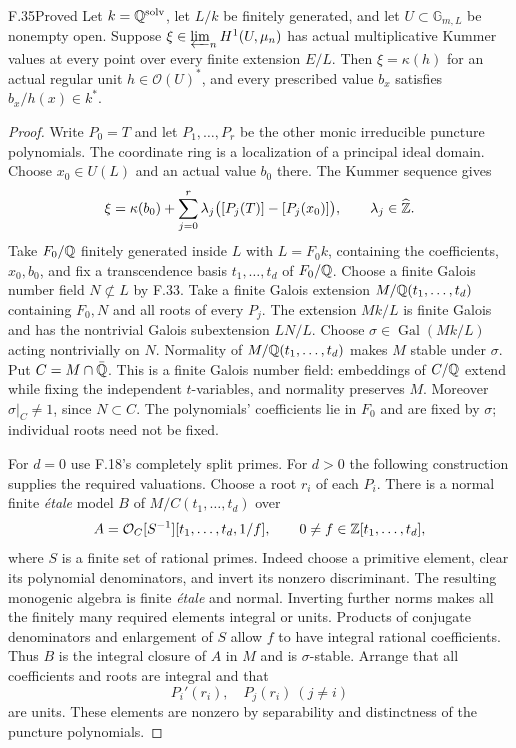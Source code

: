 \begin{claim}{F.35}{Proved}
Let $k=\mathbb Q^{\mathrm{solv}}$, let $L/k$ be finitely generated,
and let $U\subset\mathbb G_{m,L}$ be nonempty open. Suppose
$\xi\in\varprojlim_n H^1(U,\mu_n)$ has actual multiplicative
Kummer values at every point over every finite extension $E/L$.
Then $\xi=\kappa(h)$ for an actual regular unit
$h\in\mathcal O(U)^*$, and every prescribed value $b_x$ satisfies
$b_x/h(x)\in k^*$.
\end{claim}
\begin{proof}
Write $P_0=T$ and let $P_1,\ldots,P_r$ be the other monic
irreducible puncture polynomials. The coordinate ring is a
localization of a principal ideal domain. Choose $x_0\in U(L)$
and an actual value $b_0$ there. The Kummer sequence gives
\[
 \xi=\kappa(b_0)+\sum_{j=0}^r\lambda_j
       \bigl([P_j(T)]-[P_j(x_0)]\bigr),
       \qquad\lambda_j\in\widehat{\mathbb Z}.
\]
Take $F_0/\mathbb Q$ finitely generated inside $L$ with $L=F_0k$,
containing the coefficients, $x_0,b_0$, and fix a transcendence
basis $t_1,\ldots,t_d$ of $F_0/\mathbb Q$.
Choose a finite Galois number field $N\not\subset L$ by F.33.
Take a finite Galois extension $M/\mathbb Q(t_1,\ldots,t_d)$ containing
$F_0,N$ and all roots of every $P_j$. The extension $Mk/L$
is finite Galois and has the nontrivial Galois subextension
$LN/L$. Choose $\sigma\in\operatorname{Gal}(Mk/L)$ acting
nontrivially on $N$. Normality of $M/\mathbb Q(t_1,\ldots,t_d)$
makes $M$ stable under $\sigma$. Put $C=M\cap\bar{\mathbb Q}$.
This is a finite Galois number field: embeddings of $C/\mathbb Q$
extend while fixing the independent $t$-variables, and normality
preserves $M$. Moreover $\sigma|_C\ne1$, since $N\subset C$.
The polynomials' coefficients lie in $F_0$ and are fixed by
$\sigma$; individual roots need not be fixed.

For $d=0$ use F.18's completely split primes. For $d>0$ the
following construction supplies the required valuations.
Choose a root $r_i$ of each $P_i$. There is a normal finite
\emph{\'etale} model $B$ of $M/C(t_1,\ldots,t_d)$ over
\[
 A=\mathcal O_C[S^{-1}][t_1,\ldots,t_d,1/f],
 \qquad0\ne f\in\mathbb Z[t_1,\ldots,t_d],
\]
where $S$ is a finite set of rational primes. Indeed choose a
primitive element, clear its polynomial denominators, and invert
its nonzero discriminant. The resulting monogenic algebra is
finite \emph{\'etale} and normal. Inverting further norms
makes all the finitely many required elements integral or units.
Products of conjugate denominators and enlargement of $S$
allow $f$ to have integral rational coefficients. Thus $B$ is
the integral closure of $A$ in $M$ and is $\sigma$-stable.
Arrange that all coefficients and roots are integral and that
\[
 P_i'(r_i),\quad P_j(r_i)\ (j\ne i)
\]
are units. These elements are nonzero by separability and
distinctness of the puncture polynomials.


\end{proof}
